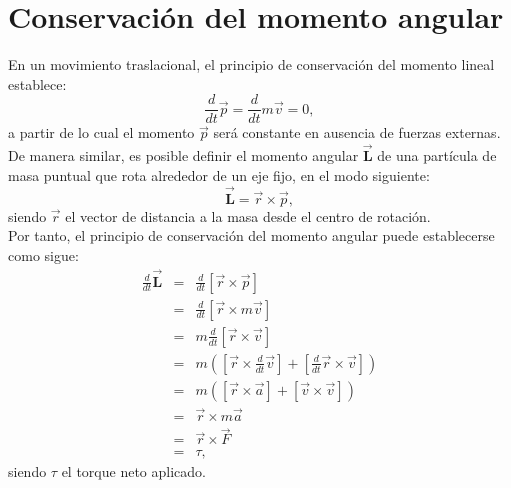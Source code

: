 \section*{Conservación del momento angular}
\noindent En un movimiento traslacional, el principio de conservación del momento lineal establece:
\begin{equation}
\frac{d}{dt}\vec{p} = \frac{d}{dt}{m\vec{v}} = 0,
\end{equation}
a partir de lo cual el momento $\vec{p}$ será constante en ausencia de fuerzas externas.\\

De manera similar, es posible definir el momento angular $\vec{\mathbf{L}}$ de una partícula de masa puntual que rota alrededor de un eje fijo, en el modo siguiente:
\begin{equation}\label{momang}
\vec{\mathbf{L}} = \vec{r} \times \vec{p},
\end{equation}
siendo $\vec{r}$ el vector de distancia a la masa desde el centro de rotación.\\

\noindent Por tanto, el principio de conservación del momento angular puede establecerse como sigue:
\begin{eqnarray*}
\frac{d}{dt}\vec{\mathbf{L}} & = & \frac{d}{dt}{[\vec{r} \times \vec{p}]} \\
                             & = & \frac{d}{dt}{[\vec{r} \times m\vec{v}]}\\
                             & = & m \frac{d}{dt}{[\vec{r} \times \vec{v}]}\\
                             & = & m\left([\vec{r}\times\frac{d}{dt}\vec{v}]+[\frac{d}{dt}\vec{r}\times\vec{v}]\right)\\
                             & = & m\left([\vec{r}\times \vec{a}]+[\vec{v}\times\vec{v}]\right)\\
                             & = & \vec{r}\times m\vec{a}\\
                             & = & \vec{r}\times \vec{F}\\
                             & = & \tau,
\end{eqnarray*}
siendo $\tau$ el torque neto aplicado.\\

